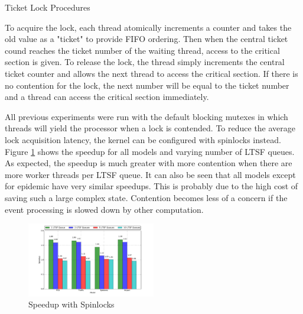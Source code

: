 \documentclass[11pt]{book}
\begin{document}
\begin{algorithm}
\DontPrintSemicolon
{}

    \;


    \caption{Ticket Lock Procedures\cite{wiki:ticketlock-15}}\label{ticket_lock}
\end{algorithm}

To acquire the lock, each thread atomically increments a counter and takes the old value as
a "ticket" to provide FIFO ordering.  Then when the central ticket cound reaches the ticket number
of the waiting thread, access to the critical section is given.  To release the lock, the thread
simply increments the central ticket counter and allows the next thread to access the critical section.
If there is no contention for the lock, the next number will be equal to the ticket number and
a thread can access the critical section immediately.

All previous experiments were run with the default blocking mutexes in which threads will yield
the processor when a lock is contended.  To reduce the average lock acquisition latency, the
kernel can be configured with spinlocks instead.  Figure \ref{spinlock_speedup} shows the speedup
for all models and varying number of LTSF queues.  As expected, the speedup is much greater with
more contention when there are more worker threads per LTSF queue.  It can also be seen that all
models except for epidemic have very similar speedups.  This is probably due to the high cost
of saving such a large complex state.  Contention becomes less of a concern if the event processing
is slowed down by other computation.

\begin{figure}
\centering
  \includegraphics[width=0.5\textwidth,quiet]{figs/pending_event_set/spinlock_speedup.pdf}
  \caption{Speedup with Spinlocks}\label{spinlock_speedup}
\end{figure}
\end{document}
